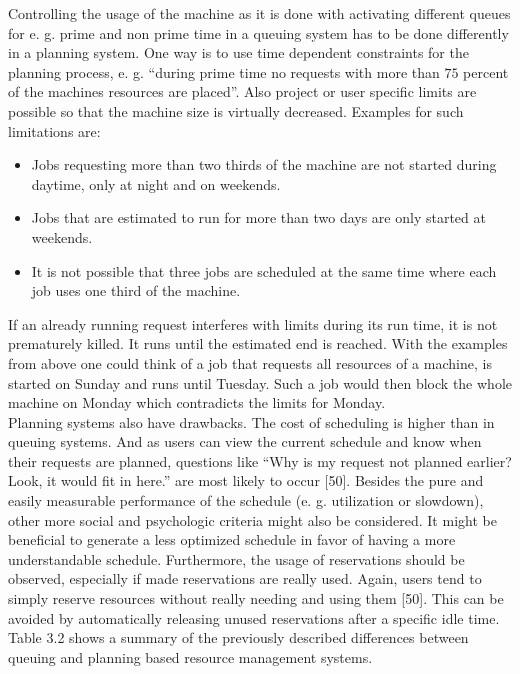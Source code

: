 Controlling the usage of the machine as it is done with activating different queues for e. g. prime and non prime time in a queuing system has to be done differently in a planning system. One way is to use time dependent constraints for the planning process, e. g. “during prime time no requests with more than $75$ percent of the machines resources are placed”. Also project or user specific limits are possible so that the machine size is virtually decreased. Examples for such limitations are:
\begin{itemize}
\item Jobs requesting more than two thirds of the machine are not started during daytime, only at night and on weekends.
\item Jobs that are estimated to run for more than two days are only started at weekends.
\item It is not possible that three jobs are scheduled at the same time where each job uses one third of the machine.
\end{itemize}
If an already running request interferes with limits during its run time, it is not prematurely killed. It runs until the estimated end is reached. With the examples from above one could think of a job that requests all resources of a machine, is started on Sunday and runs until Tuesday. Such a job would then block the whole machine on Monday which contradicts the limits for Monday.\\

Planning systems also have drawbacks. The cost of scheduling is higher than in queuing systems. And as users can view the current schedule and know when their requests are planned, questions like “Why is my request not planned earlier? Look, it would fit in here.” are most likely to occur [50]. Besides the pure and easily measurable performance of the schedule (e. g. utilization or slowdown), other more social and psychologic criteria might also be considered. It might be beneficial to generate a less optimized schedule in favor of having a more understandable schedule. Furthermore, the usage of reservations should be observed, especially if made reservations are really used. Again, users tend to simply reserve resources without really needing and using them [50]. This can be avoided by automatically releasing unused reservations after a specific idle time.\\

Table 3.2 shows a summary of the previously described differences between queuing and planning based resource management systems.\\
